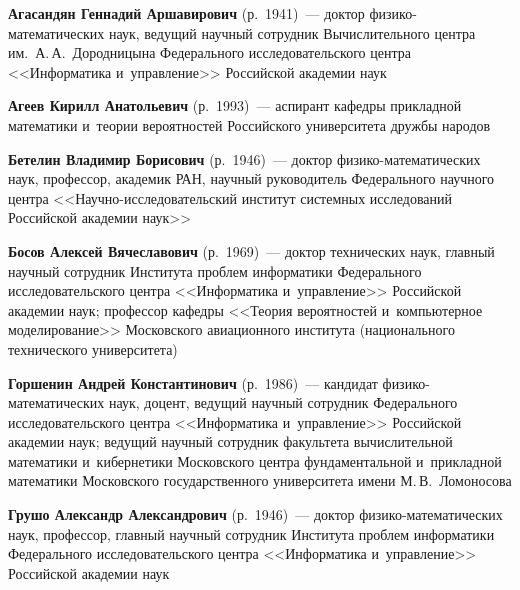 \begin{multicols}{2}



\noindent
\textbf{Агасандян Геннадий Аршавирович} (р.\ 1941)~--- 
доктор фи\-зи\-ко-ма\-те\-ма\-ти\-че\-ских наук, ведущий научный 
сотрудник Вычислительного цент\-ра им.\ А.\,А.~Дородницына 
Федерального исследовательского цент\-ра <<Информатика и~управ\-ле\-ние>>
 Российской академии наук
 
 
 \noindent
\textbf{Агеев Кирилл Анатольевич} (р.\ 1993)~--- 
аспирант кафедры прикладной математики и~тео\-рии вероятностей 
Российского университета дружбы народов



\noindent
\textbf{Бетелин Владимир Борисович} (р.\ 1946)~--- доктор 
фи\-зи\-ко-ма\-те\-ма\-ти\-че\-ских наук, профессор, академик РАН, 
научный руководитель Федерального научного цент\-ра 
<<На\-уч\-но-ис\-сле\-до\-ва\-тель\-ский институт сис\-тем\-ных исследований 
Российской академии \mbox{наук}>> %

 
\noindent
\textbf{Босов Алексей Вячеславович} (р.\ 1969)~--- 
доктор технических наук, главный научный сотрудник Института проб\-лем 
информатики Федерального исследовательского центра <<Информатика и~управ\-ле\-ние>>
 Российской академии наук; профессор кафедры 
 <<Теория вероятностей и~компьютерное моделирование>>
  Московского авиационного института (национального технического университета)
  
 
   \noindent
\textbf{Горшенин Андрей Константинович} (р.\ 1986)~--- 
кан\-дидат фи\-зи\-ко-ма\-те\-ма\-ти\-че\-ских наук, доцент, 
ведущий научный сотрудник Федерального иссле\-до\-ва\-тельского центра 
<<Информатика и~управ\-ле\-ние>> Российской академии наук; 
ведущий научный сотрудник факультета вычислительной математики 
и~\mbox{кибернетики} Московского центра фундаментальной 
и~прикладной математики Московского государственного университета 
имени М.\,В.~Ло\-мо\-но\-сова


 
 \noindent
\textbf{Грушо Александр Александрович} (р.\ 1946)~--- 
доктор фи\-зи\-ко-ма\-те\-ма\-ти\-че\-ских наук, профессор, 
главный научный сотрудник Института проб\-лем 
информатики Федерального исследовательского центра <<Информатика и~управ\-ле\-ние>>
Российской академии наук


\end{multicols}
